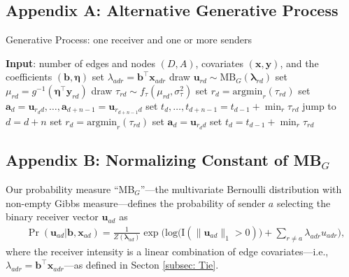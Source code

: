 \documentclass[ba]{imsart}
\numberwithin{equation}{section}
\theoremstyle{plain}
\begin{document}
	\subsection*{Appendix A: Alternative Generative Process} \label{appendix:alternativeGP}
		\begin{algorithm}[H]
			\SetAlgoLined
			\caption{Generative Process: one receiver and one or more senders}
			\begin{algorithmic}
			\STATE \textbf{Input}: number of edges and nodes $(D, A)$, covariates $(\boldsymbol{x}, \boldsymbol{y})$, and the coefficients $(\boldsymbol{b}, \boldsymbol{\eta})$
							\vskip 0.1in				
				\STATE	set $\lambda_{adr} = {\boldsymbol{b}}^{\top}\boldsymbol{x}_{adr}$
				\ENDFOR
				\STATE	draw $\boldsymbol{u}_{rd}  \sim
				\mbox{MB}_G(\boldsymbol{\lambda}_{rd})$
				\STATE		set $\mu_{rd} = g^{-1}(\boldsymbol{\eta}^\top \boldsymbol{y}_{rd})$
				\STATE		draw $\tau_{rd} \sim f_\tau(\mu_{rd}, \sigma_\tau^2)$
				\ENDFOR
				\STATE	set ${r}_d=\mbox{argmin}_{r}(\tau_{rd})$
				\STATE	set $\boldsymbol{a}_d=\boldsymbol{u}_{r_d d},\ldots,\boldsymbol{a}_{d+n-1}=\boldsymbol{u}_{r_{d+n-1} d}$
				\STATE	set $t_d, \ldots, t_{d+n-1}=t_{d-1} + \min_r\tau_{rd}$
				\STATE		jump to $d = d+n$
				\ELSE
				\STATE	set ${r}_d = \mbox{argmin}_{r}(\tau_{rd}) $
				\STATE	set $\boldsymbol{a}_d= \boldsymbol{u}_{r_d d}$
				\STATE	set $t_d =t_{d-1} + \min_r\tau_{rd}$
				\ENDIF
				\ENDFOR
			\end{algorithmic}
			\label{alg:generative2}
		\end{algorithm}
	\subsection*{Appendix B: Normalizing Constant of MB$_{G}$}\label{appendix: non-empty Gibbs measure}
	Our probability measure ``MB$_{G}$''---the multivariate Bernoulli distribution with non-empty Gibbs measure---defines the probability of sender $a$ selecting the binary receiver vector $\boldsymbol{u}_{ad}$ as
	\begin{equation*} 
	\begin{aligned}
	& \Pr(\boldsymbol{u}_{ad}|\boldsymbol{b}, \boldsymbol{x}_{ad}) = \frac{1}{Z(\boldsymbol{\lambda}_{ad})}\exp\Big(\mbox{log}\big(\text{I}(\lVert \boldsymbol{u}_{ad} \rVert_1 > 0)\big) + \sum_{r \neq a} \lambda_{adr}u_{adr} \Big),
	\end{aligned}
	\end{equation*}
	where the receiver intensity is a linear combination of edge covariates---i.e., $\lambda_{adr} = {\boldsymbol{b}}^{\top}\boldsymbol{x}_{adr}$---as defined in Secton \ref{subsec: Tie}.
	
\end{document}
